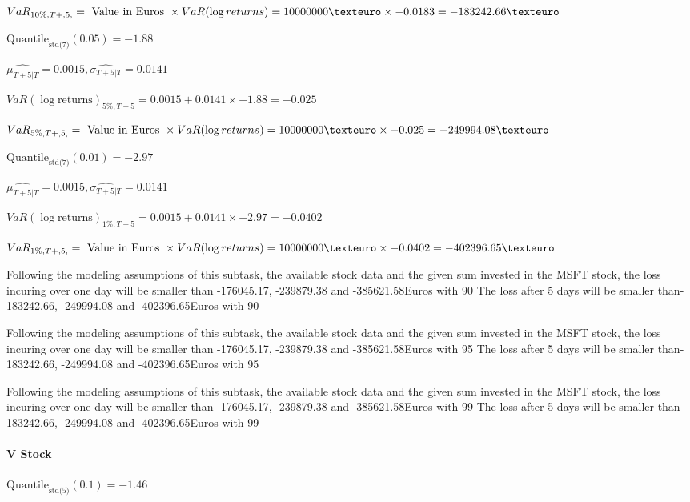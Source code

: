 $VaR_{10\%, T + ,5,} = \text{ Value in Euros } \times VaR(\log returns) = 10 000 000 \texteuro \times-0.0183 = -183242.66 \texteuro$


$\text{Quantile}_\text{std(7)}(0.05) = -1.88$

$\hat{\mu_{T+5|T}} = 0.0015, \hat{\sigma_{T+5|T}} = 0.0141$

$VaR(\log \text{returns})_{5\%, T + 5} = 0.0015 + 0.0141\times-1.88 = -0.025$

$VaR_{5\%, T + ,5,} = \text{ Value in Euros } \times VaR(\log returns) = 10 000 000 \texteuro \times-0.025 = -249994.08 \texteuro$


$\text{Quantile}_\text{std(7)}(0.01) = -2.97$

$\hat{\mu_{T+5|T}} = 0.0015, \hat{\sigma_{T+5|T}} = 0.0141$

$VaR(\log \text{returns})_{1\%, T + 5} = 0.0015 + 0.0141\times-2.97 = -0.0402$

$VaR_{1\%, T + ,5,} = \text{ Value in Euros } \times VaR(\log returns) = 10 000 000 \texteuro \times-0.0402 = -402396.65 \texteuro$


Following the modeling assumptions of this subtask, the available stock data and the given sum invested in the MSFT stock, the loss incuring over one day will be smaller than -176045.17, -239879.38 and -385621.58Euros with 90%
The loss after 5 days will be smaller than-183242.66, -249994.08 and -402396.65Euros with 90%
 

Following the modeling assumptions of this subtask, the available stock data and the given sum invested in the MSFT stock, the loss incuring over one day will be smaller than -176045.17, -239879.38 and -385621.58Euros with 95%
The loss after 5 days will be smaller than-183242.66, -249994.08 and -402396.65Euros with 95%
 

Following the modeling assumptions of this subtask, the available stock data and the given sum invested in the MSFT stock, the loss incuring over one day will be smaller than -176045.17, -239879.38 and -385621.58Euros with 99%
The loss after 5 days will be smaller than-183242.66, -249994.08 and -402396.65Euros with 99%

\paragraph{V Stock}


$\text{Quantile}_\text{std(5)}(0.1) = -1.46$

